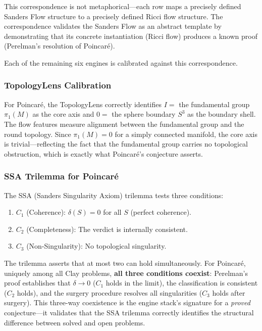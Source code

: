 \documentclass[11pt]{article}
\begin{document}
\noindent
This correspondence is not metaphorical---each row maps a precisely
defined Sanders Flow structure to a precisely defined Ricci flow
structure.  The correspondence validates the Sanders Flow as an abstract
template by demonstrating that its concrete instantiation (Ricci flow)
produces a known proof (Perelman's resolution of Poincar\'e).

Each of the remaining six engines is calibrated against this
correspondence.

\subsubsection{TopologyLens Calibration}

For Poincar\'e, the TopologyLens correctly identifies $I =$ the fundamental group
$\pi_1(M)$ as the core axis and $0 =$ the sphere boundary $S^3$ as the boundary
shell.  The flow features measure alignment between the fundamental group and the
round topology.  Since $\pi_1(M) = 0$ for a simply connected manifold, the
core axis is trivial---reflecting the fact that the fundamental group carries no
topological obstruction, which is exactly what Poincar\'e's conjecture asserts.

\subsubsection{SSA Trilemma for Poincar\'e}

The SSA (Sanders Singularity Axiom) trilemma tests three conditions:
\begin{enumerate}
\item $C_1$ (Coherence): $\delta(S) = 0$ for all $S$ (perfect coherence).
\item $C_2$ (Completeness): The verdict is internally consistent.
\item $C_3$ (Non-Singularity): No topological singularity.
\end{enumerate}

\noindent
The trilemma asserts that at most two can hold simultaneously.  For
Poincar\'e, uniquely among all Clay problems, \textbf{all three conditions
coexist}: Perelman's proof establishes that $\delta \to 0$ ($C_1$ holds in
the limit), the classification is consistent ($C_2$ holds), and the surgery
procedure resolves all singularities ($C_3$ holds after surgery).  This
three-way coexistence is the engine stack's signature for a \emph{proved}
conjecture---it validates that the SSA trilemma correctly identifies the
structural difference between solved and open problems.
\end{document}
